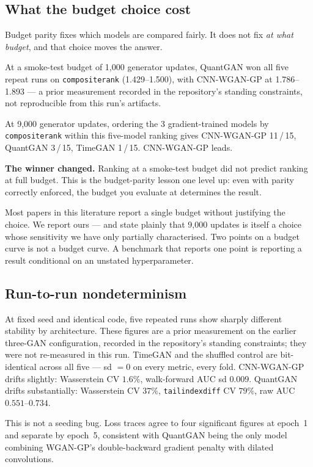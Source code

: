 \documentclass[11pt,a4paper]{article}
\makeatletter
\DeclareRobustCommand{\_}{\ifmmode\nfss@text{\textunderscore}\else\textunderscore\allowbreak\fi}
\makeatother
\begin{document}
\subsection{What the budget choice cost}
\label{sec:budget}
Budget parity fixes which models are compared fairly. It does not fix \emph{at what budget}, and that choice moves the answer.

At a smoke-test budget of 1{,}000 generator updates, QuantGAN won all five repeat runs on \texttt{composite\_rank} (1.429--1.500), with CNN-WGAN-GP at 1.786--1.893 --- a prior measurement recorded in the repository's standing constraints, not reproducible from this run's artifacts.

At 9,000 generator updates, ordering the 3 gradient-trained models by \texttt{composite\_rank} within this five-model ranking gives CNN-WGAN-GP 11\,/\,15, QuantGAN 3\,/\,15, TimeGAN 1\,/\,15. CNN-WGAN-GP leads.

\textbf{The winner changed.} Ranking at a smoke-test budget did not predict ranking at full budget. This is the budget-parity lesson one level up: even with parity correctly enforced, the budget you evaluate at determines the result.

Most papers in this literature report a single budget without justifying the choice. We report ours --- and state plainly that 9,000 updates is itself a choice whose sensitivity we have only partially characterised. Two points on a budget curve is not a budget curve. A benchmark that reports one point is reporting a result conditional on an unstated hyperparameter.

\subsection{Run-to-run nondeterminism}
\label{sec:nondeterminism}
At fixed seed and identical code, five repeated runs show sharply different stability by architecture. These figures are a prior measurement on the earlier three-GAN configuration, recorded in the repository's standing constraints; they were not re-measured in this run. TimeGAN and the shuffled control are bit-identical across all five --- sd $=0$ on every metric, every fold. CNN-WGAN-GP drifts slightly: Wasserstein CV $1.6\%$, walk-forward AUC sd $0.009$. QuantGAN drifts substantially: Wasserstein CV $37\%$, \texttt{tail\_index\_diff} CV $79\%$, raw AUC $0.551$--$0.734$.

This is not a seeding bug. Loss traces agree to four significant figures at epoch~1 and separate by epoch~5, consistent with QuantGAN being the only model combining WGAN-GP's double-backward gradient penalty with dilated convolutions.
\end{document}
